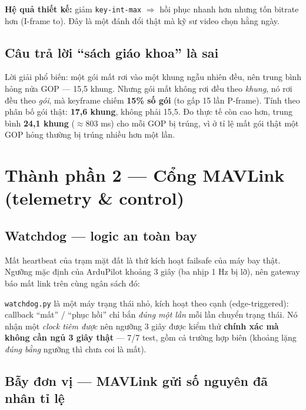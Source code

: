 \documentclass[12pt]{ai_conquer2026}
\begin{document}
\textbf{Hệ quả thiết kế:} giảm \texttt{key-int-max} $\Rightarrow$ hồi phục nhanh
hơn nhưng tốn bitrate hơn (I-frame to). Đây là một đánh đổi thật mà kỹ sư video
chọn hằng ngày.

\subsection{Câu trả lời ``sách giáo khoa'' là sai}

Lời giải phổ biến: một gói mất rơi vào một khung ngẫu nhiên đều, nên trung bình
hỏng nửa GOP --- 15,5 khung. Nhưng gói mất không rơi đều theo \emph{khung}, nó
rơi đều theo \emph{gói}, mà keyframe chiếm \textbf{15\% số gói} (to gấp 15 lần
P-frame). Tính theo phân bố gói thật: \textbf{17,6 khung}, không phải 15,5. Đo
thực tế còn cao hơn, trung bình \textbf{24,1 khung} ($\approx$803 ms) cho mỗi GOP
bị trúng, vì ở tỉ lệ mất gói thật một GOP hỏng thường bị trúng nhiều hơn một lần.

\section{Thành phần 2 --- Cổng MAVLink (telemetry \& control)}

\subsection{Watchdog --- logic an toàn bay}

Mất heartbeat của trạm mặt đất là thứ kích hoạt failsafe của máy bay thật.
Ngưỡng mặc định của ArduPilot khoảng 3 giây (ba nhịp 1 Hz bị lỡ), nên gateway báo
mất link trên cùng ngân sách đó:


\texttt{watchdog.py} là một máy trạng thái nhỏ, kích hoạt theo cạnh
(edge-triggered): callback ``mất'' / ``phục hồi'' chỉ bắn \emph{đúng một lần} mỗi
lần chuyển trạng thái. Nó nhận một \emph{clock tiêm được} nên ngưỡng 3 giây được
kiểm thử \textbf{chính xác mà không cần ngủ 3 giây thật} --- 7/7 test, gồm cả
trường hợp biên (khoảng lặng \emph{đúng bằng} ngưỡng thì chưa coi là mất).

\subsection{Bẫy đơn vị --- MAVLink gửi số nguyên đã nhân tỉ lệ}
\end{document}
